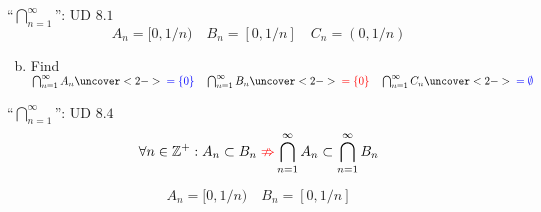 \begin{frame}{}
  \begin{exampleblock}{``$\bigcap_{n = 1}^{\infty}$'': UD $8.1$}
    \[
      A_n = [0, 1/n) \quad B_n = [0, 1/n] \quad C_n = (0, 1/n)
    \]

    \begin{enumerate}[(a)]
      \setcounter{enumi}{1}
      \item Find $\bigcap_{n=1}^{\infty} A_n \uncover<2->{\blue{\;= \set{0}}}
	\quad \bigcap_{n=1}^{\infty} B_n \uncover<2->{\red{\;= \set{0}}} 
	\quad \bigcap_{n=1}^{\infty} C_n \uncover<2->{\blue{\;= \emptyset}}$
    \end{enumerate}
  \end{exampleblock}

  \vspace{0.50cm}
  
  \vspace{0.30cm}
\end{frame}

\begin{frame}{}
  \begin{exampleblock}{``$\bigcap_{n = 1}^{\infty}$'': UD $8.4$}
    \[
      \forall n \in \mathbb{Z}^{+}: A_n \subset B_n \textcolor{red}{\;\nRightarrow} \bigcap_{n=1}^{\infty} A_n \subset \bigcap_{n=1}^{\infty} B_n
    \]
  \end{exampleblock}

  \[
    A_n = [0, 1/n) \quad B_n = [0, 1/n]
  \]

  \pause
  \vspace{0.40cm}
\end{frame}

